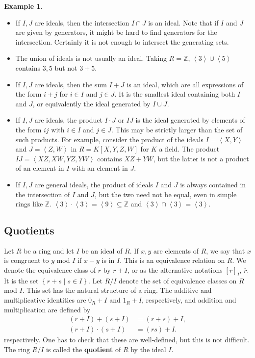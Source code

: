 \documentclass{article}
\newcommand{\Z}{\mathbb{Z}}
\newcommand{\rb}[1]{\left( #1 \right)}
\renewcommand{\sb}[1]{\left[ #1 \right]}
\newcommand{\cb}[1]{\left\{ #1 \right\}}
\newcommand{\ab}[1]{\left\langle #1 \right\rangle}
\theoremstyle{definition}\newtheorem{definition}{Definition}[subsection]
\theoremstyle{definition}\newtheorem{remark}[definition]{Remark}
\theoremstyle{definition}\newtheorem*{example}{Example}
\theoremstyle{definition}\newtheorem*{note}{Note}
\begin{document}
\begin{example}
\hfill
\begin{itemize}
\item If $ I, J $ are ideals, then the intersection $ I \cap J $ is an ideal. Note that if $ I $ and $ J $ are given by generators, it might be hard to find generators for the intersection. Certainly it is not enough to intersect the generating sets.
\item The union of ideals is not usually an ideal. Taking $ R = \Z $, $ \ab{3} \cup \ab{5} $ contains $ 3, 5 $ but not $ 3 + 5 $.
\item If $ I, J $ are ideals, then the sum $ I + J $ is an ideal, which are all expressions of the form $ i + j $ for $ i \in I $ and $ j \in J $. It is the smallest ideal containing both $ I $ and $ J $, or equivalently the ideal generated by $ I \cup J $.
\item If $ I, J $ are ideals, the product $ I \cdot J $ or $ IJ $ is the ideal generated by elements of the form $ ij $ with $ i \in I $ and $ j \in J $. This may be strictly larger than the set of such products. For example, consider the product of the ideals $ I = \ab{X, Y} $ and $ J = \ab{Z, W} $ in $ R = K\sb{X, Y, Z, W} $ for $ K $ a field. The product $ IJ = \ab{XZ, XW, YZ, YW} $ contains $ XZ + YW $, but the latter is not a product of an element in $ I $ with an element in $ J $.
\item If $ I, J $ are general ideals, the product of ideals $ I $ and $ J $ is always contained in the intersection of $ I $ and $ J $, but the two need not be equal, even in simple rings like $ \Z $. $ \ab{3} \cdot \ab{3} = \ab{9} \subseteq \Z $ and $ \ab{3} \cap \ab{3} = \ab{3} $.
\end{itemize}
\end{example}

\subsection{Quotients}

Let $ R $ be a ring and let $ I $ be an ideal of $ R $. If $ x, y $ are elements of $ R $, we say that $ x $ is congruent to $ y $ mod $ I $ if $ x - y $ is in $ I $. This is an equivalence relation on $ R $. We denote the equivalence class of $ r $ by $ r + I $, or as the alternative notations $ \sb{r}_I $, $ \overline{r} $. It is the set $ \cb{r + s \mid s \in I} $. Let $ R / I $ denote the set of equivalence classes on $ R $ mod $ I $. This set has the natural structure of a ring. The additive and multiplicative identities are $ 0_R + I $ and $ 1_R + I $, respectively, and addition and multiplication are defined by
\begin{align*}
\rb{r + I} + \rb{s + I} & = \rb{r + s} + I, \\
\rb{r + I} \cdot \rb{s + I} & = \rb{rs} + I.
\end{align*}
respectively. One has to check that these are well-defined, but this is not difficult. The ring $ R / I $ is called the \textbf{quotient} of $ R $ by the ideal $ I $.
\end{document}
